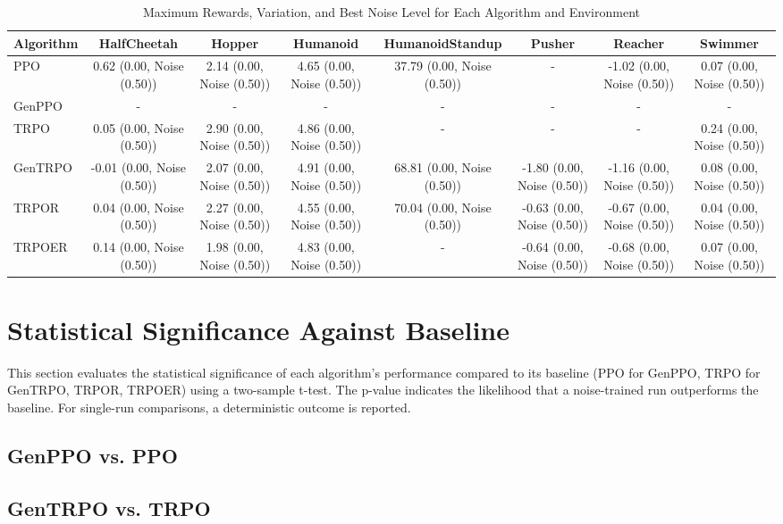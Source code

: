\begin{table}[h]
\centering
\caption{Maximum Rewards, Variation, and Best Noise Level for Each Algorithm and Environment}
\label{tab:numerical_results}
\begin{tabular}{|l|c|c|c|c|c|c|c|}
\hline
Algorithm & HalfCheetah & Hopper & Humanoid & HumanoidStandup & Pusher & Reacher & Swimmer \\ \hline
PPO & 0.62 (0.00, Noise (0.50)) & 2.14 (0.00, Noise (0.50)) & 4.65 (0.00, Noise (0.50)) & 37.79 (0.00, Noise (0.50)) & - & -1.02 (0.00, Noise (0.50)) & 0.07 (0.00, Noise (0.50)) \\ \hline
GenPPO & - & - & - & - & - & - & - \\ \hline
TRPO & 0.05 (0.00, Noise (0.50)) & 2.90 (0.00, Noise (0.50)) & 4.86 (0.00, Noise (0.50)) & - & - & - & 0.24 (0.00, Noise (0.50)) \\ \hline
GenTRPO & -0.01 (0.00, Noise (0.50)) & 2.07 (0.00, Noise (0.50)) & 4.91 (0.00, Noise (0.50)) & 68.81 (0.00, Noise (0.50)) & -1.80 (0.00, Noise (0.50)) & -1.16 (0.00, Noise (0.50)) & 0.08 (0.00, Noise (0.50)) \\ \hline
TRPOR & 0.04 (0.00, Noise (0.50)) & 2.27 (0.00, Noise (0.50)) & 4.55 (0.00, Noise (0.50)) & 70.04 (0.00, Noise (0.50)) & -0.63 (0.00, Noise (0.50)) & -0.67 (0.00, Noise (0.50)) & 0.04 (0.00, Noise (0.50)) \\ \hline
TRPOER & 0.14 (0.00, Noise (0.50)) & 1.98 (0.00, Noise (0.50)) & 4.83 (0.00, Noise (0.50)) & - & -0.64 (0.00, Noise (0.50)) & -0.68 (0.00, Noise (0.50)) & 0.07 (0.00, Noise (0.50)) \\ \hline
\end{tabular}
\end{table}
\section{Statistical Significance Against Baseline}
This section evaluates the statistical significance of each algorithm’s performance compared to its baseline (PPO for GenPPO, TRPO for GenTRPO, TRPOR, TRPOER) using a two-sample t-test. The p-value indicates the likelihood that a noise-trained run outperforms the baseline. For single-run comparisons, a deterministic outcome is reported.
\subsection{GenPPO vs. PPO}
\subsection{GenTRPO vs. TRPO}
